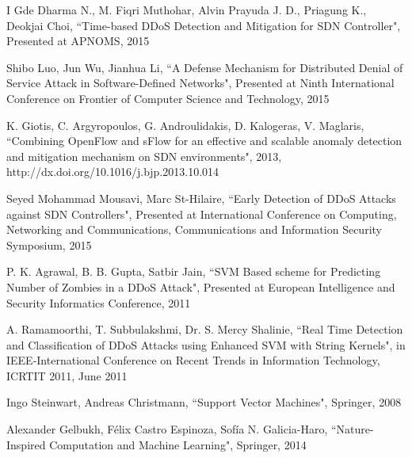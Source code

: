 \documentclass[12pt,a4paper,final]{report}
\begin{document}
\begin{thebibliography}{9}
I Gde Dharma N., M. Fiqri Muthohar, Alvin Prayuda J. D., Priagung K., Deokjai Choi,
``Time-based DDoS Detection and Mitigation for SDN Controller",
Presented at APNOMS,
2015

Shibo Luo, Jun Wu, Jianhua Li,
``A Defense Mechanism for Distributed Denial of Service Attack in Software-Defined Networks",
Presented at Ninth International Conference on Frontier of Computer Science and Technology,
2015

K. Giotis, C. Argyropoulos, G. Androulidakis, D. Kalogeras, V. Maglaris,
``Combining OpenFlow and sFlow for an effective and scalable anomaly detection and mitigation mechanism on SDN environments",
2013, 
http://dx.doi.org/10.1016/j.bjp.2013.10.014

Seyed Mohammad Mousavi, Marc St-Hilaire,
``Early Detection of DDoS Attacks against SDN Controllers",
Presented at International Conference on Computing, Networking and Communications, Communications and Information Security
Symposium,
2015

P. K. Agrawal, B. B. Gupta, Satbir Jain,
``SVM Based scheme for Predicting Number of Zombies in a DDoS Attack",
Presented at European Intelligence and Security Informatics Conference,
2011

A. Ramamoorthi, T. Subbulakshmi, Dr. S. Mercy Shalinie,
``Real Time Detection and Classification of DDoS Attacks using Enhanced SVM with String Kernels",
in IEEE-International Conference on Recent Trends in Information Technology,
ICRTIT 2011,
June 2011

Ingo Steinwart, Andreas Christmann,
``Support Vector Machines",
Springer, 
2008

Alexander Gelbukh, Félix Castro Espinoza, Sofía N. Galicia-Haro,
``Nature-Inspired Computation and Machine Learning",
Springer,
2014
\end{thebibliography}
\endgroup
\newpage
\end{document}
